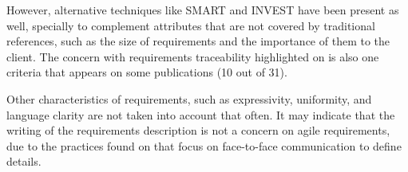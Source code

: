 However, alternative techniques like SMART and INVEST \cite{SMART_INVEST_2013} have been present as well, specially to complement attributes that are not covered by traditional references, such as the size of requirements and the importance of them to the client. The concern with requirements traceability highlighted on \cite{Inayat_2015} is also one criteria that appears on some publications (10 out of 31).

Other characteristics of requirements, such as expressivity, uniformity, and language clarity are not taken into account that often. It may indicate that the writing of the requirements description is not a concern on agile requirements, due to the practices found on \cite{Inayat_2015} that focus on face-to-face communication to define details. 